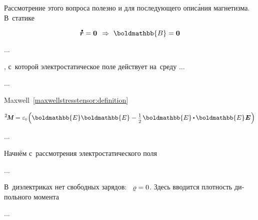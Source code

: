 \begin{otherlanguage}{russian}

Рассмотрение этого вопроса полезно и для последующего опис\'{а}ния магнетизма.
В~статике

\nopagebreak\vspace{-0.2em}\begin{equation*}
\velocityofpoint = \zerovector
\hspace{.44em} \Rightarrow \hspace{.33em}
\boldmathbb{B} = \zerovector
\end{equation*}

...

  , с~которой электростатическое поле действует на~среду ...

...

Maxwell~\eqref{maxwellstresstensor:definition} 

\nopagebreak\vspace{-0.2em}\begin{equation*}
\maxwellstress = \vacuumpermittivity \hspace{-0.2ex} \left( \boldmathbb{E} \boldmathbb{E} - \smalldisplaystyleonehalf \hspace{.2ex} \boldmathbb{E} \hspace{-0.1ex} \dotp \hspace{-0.16ex} \boldmathbb{E} \hspace{.1ex} \UnitDyad \hspace{.1ex} \right)
\end{equation*}

...

\end{otherlanguage}



\begin{otherlanguage}{russian}

Начнём с~рассмотрения электростатического поля

...

В~диэлектриках нет свободных зарядов:
~${\varrho = 0}$.
Здесь вводится плотность дипольного момента

...


\end{otherlanguage}

